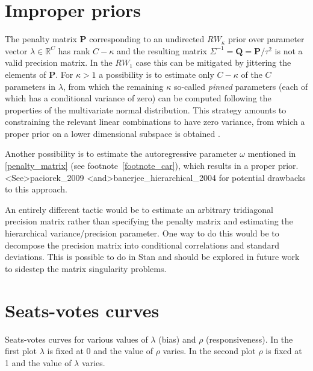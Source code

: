 

\renewcommand\thesection{\Alph{section}}
\section[Improper priors]{Improper priors} \label{AppendixA}

The penalty matrix $\mathbf{P}$ corresponding to an undirected $RW_\kappa$ prior over 
parameter vector $\lambda \in \mathbb{R}^C$ has rank $C - \kappa$ and the resulting 
matrix $\Sigma^{-1} = \mathbf{Q} = \mathbf{P}/\tau^2$ is not a valid precision matrix. In the 
$RW_1$ case this can be mitigated by jittering the elements of $\mathbf{P}$. For $\kappa > 1$ 
a possibility is to estimate only $C - \kappa$ of the $C$ parameters in $\lambda$,  from 
which the remaining $\kappa$ so-called {\it pinned} parameters (each of which has a 
conditional variance of zero) can be computed following the properties of the multivariate 
normal distribution. This strategy amounts to  constraining the relevant linear combinations 
to have zero variance, from which a proper prior on a lower dimensional subspace is 
obtained . 

Another possibility is to estimate the autoregressive parameter $\omega$ mentioned 
in \ref{penalty_matrix} (see footnote~\ref{footnote_car}), which results in a proper prior.
\citeA<See>{paciorek_2009} \citeA<and>{banerjee_hierarchical_2004} for potential
drawbacks to this approach.

An entirely different tactic would be to estimate an arbitrary tridiagonal precision matrix 
rather than specifying the penalty matrix and estimating the hierarchical variance/precision 
parameter. One way to do this would be to decompose the precision matrix into conditional 
correlations and standard deviations. This is possible to do in Stan and should be explored 
in future work to sidestep the matrix singularity problems. 


\clearpage
\section[Seats-votes curves]{Seats-votes curves}\label{AppendixB}

Seats-votes curves for various values of $\lambda$ (bias) and $\rho$ (responsiveness). 
In the first plot $\lambda$ is fixed at 0 and the value of $\rho$ varies. In the second plot $\rho$ is fixed at 1 
and the value of $\lambda$ varies. 


